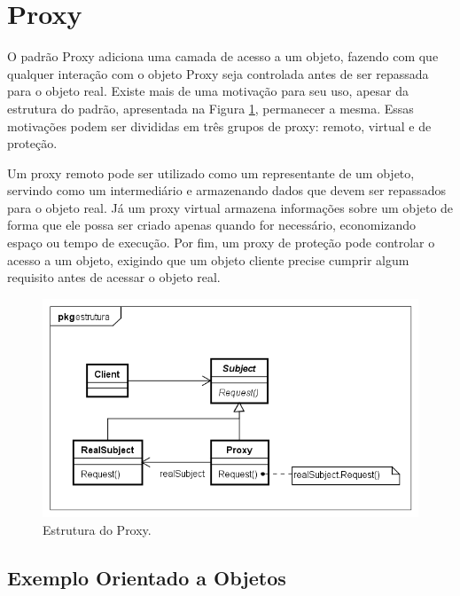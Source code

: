 \section{Proxy}

O padrão Proxy adiciona uma camada de acesso 
a um objeto, fazendo com que qualquer interação 
com o objeto Proxy seja controlada antes de ser 
repassada para o objeto real. Existe mais 
de uma motivação para seu uso, apesar 
da estrutura do padrão, 
apresentada na Figura \ref{proxy_struct},  
permanecer a mesma. Essas motivações 
podem ser divididas em três grupos de 
proxy: remoto, virtual e de proteção. \cite{gamma:1995}

Um proxy remoto pode ser utilizado como um 
representante de um objeto, servindo como um 
intermediário e armazenando dados que devem 
ser repassados para o objeto real. Já um 
proxy virtual armazena informações sobre 
um objeto de forma que ele possa ser criado 
apenas quando for necessário, economizando 
espaço ou tempo de execução. Por fim, um 
proxy de proteção pode controlar o acesso 
a um objeto, exigindo que um objeto cliente 
precise cumprir algum requisito antes de 
acessar o objeto real. \cite{gamma:1995}

\begin{figure}[htb]
	\caption{\label{proxy_struct}Estrutura do Proxy.}
	\begin{center}
	    \includegraphics[scale=0.5]{5_padroes-contexto-funcional/5.2_estruturais/5.2.7_proxy/proxy_estrutura.png}
	\end{center}
\end{figure}

\subsection*{Exemplo Orientado a Objetos}

